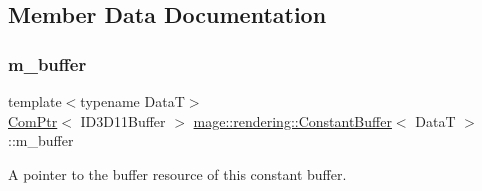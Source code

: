 \subsection{Member Data Documentation}
\mbox{\label{classmage_1_1rendering_1_1_constant_buffer_ae5b259b0afca9b20254735a09eccc1fc}} 
\subsubsection{\texorpdfstring{m\+\_\+buffer}{m\_buffer}}
{\footnotesize\ttfamily template$<$typename DataT$>$ \\
\mbox{\hyperlink{namespacemage_ae74f374780900893caa5555d1031fd79}{Com\+Ptr}}$<$ I\+D3\+D11\+Buffer $>$ \mbox{\hyperlink{classmage_1_1rendering_1_1_constant_buffer}{mage\+::rendering\+::\+Constant\+Buffer}}$<$ DataT $>$\+::m\+\_\+buffer\hspace{0.3cm}{\ttfamily [private]}}

A pointer to the buffer resource of this constant buffer. 